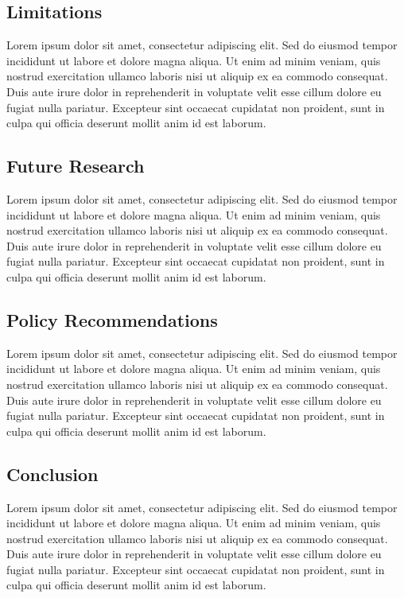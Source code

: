 \documentclass[
  12pt,
]{article}
\begin{document}
\subsection{Limitations}\label{limitations}

Lorem ipsum dolor sit amet, consectetur adipiscing elit. Sed do eiusmod
tempor incididunt ut labore et dolore magna aliqua. Ut enim ad minim
veniam, quis nostrud exercitation ullamco laboris nisi ut aliquip ex ea
commodo consequat. Duis aute irure dolor in reprehenderit in voluptate
velit esse cillum dolore eu fugiat nulla pariatur. Excepteur sint
occaecat cupidatat non proident, sunt in culpa qui officia deserunt
mollit anim id est laborum.

\subsection{Future Research}\label{future-research}

Lorem ipsum dolor sit amet, consectetur adipiscing elit. Sed do eiusmod
tempor incididunt ut labore et dolore magna aliqua. Ut enim ad minim
veniam, quis nostrud exercitation ullamco laboris nisi ut aliquip ex ea
commodo consequat. Duis aute irure dolor in reprehenderit in voluptate
velit esse cillum dolore eu fugiat nulla pariatur. Excepteur sint
occaecat cupidatat non proident, sunt in culpa qui officia deserunt
mollit anim id est laborum.

\subsection{Policy Recommendations}\label{policy-recommendations}

Lorem ipsum dolor sit amet, consectetur adipiscing elit. Sed do eiusmod
tempor incididunt ut labore et dolore magna aliqua. Ut enim ad minim
veniam, quis nostrud exercitation ullamco laboris nisi ut aliquip ex ea
commodo consequat. Duis aute irure dolor in reprehenderit in voluptate
velit esse cillum dolore eu fugiat nulla pariatur. Excepteur sint
occaecat cupidatat non proident, sunt in culpa qui officia deserunt
mollit anim id est laborum.

\subsection{Conclusion}\label{conclusion}

Lorem ipsum dolor sit amet, consectetur adipiscing elit. Sed do eiusmod
tempor incididunt ut labore et dolore magna aliqua. Ut enim ad minim
veniam, quis nostrud exercitation ullamco laboris nisi ut aliquip ex ea
commodo consequat. Duis aute irure dolor in reprehenderit in voluptate
velit esse cillum dolore eu fugiat nulla pariatur. Excepteur sint
occaecat cupidatat non proident, sunt in culpa qui officia deserunt
mollit anim id est laborum.
\end{document}
